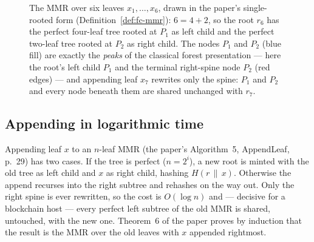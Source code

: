\documentclass[11pt,a4paper]{article}
\theoremstyle{definition}
\begin{document}
\begin{figure}[htbp]
\centering
{}
\caption{The MMR over six leaves $x_1, \dots, x_6$, drawn in the paper's
single-rooted form (Definition~\ref{def:fc-mmr}): $6 = 4 + 2$, so the root
$r_6$ has the perfect four-leaf tree rooted at $P_1$ as left child and the
perfect two-leaf tree rooted at $P_2$ as right child. The nodes $P_1$ and
$P_2$ (blue fill) are exactly the \emph{peaks} of the classical forest
presentation --- here the root's left child $P_1$ and the terminal
right-spine node $P_2$ (red edges) --- and appending leaf $x_7$ rewrites
only the spine: $P_1$ and $P_2$ and every
node beneath them are shared unchanged with $r_7$.}
\label{fig:fc-mmr}
\end{figure}

\subsection{Appending in logarithmic time}\label{sec:fc-mmr-append}

Appending leaf $x$ to an $n$-leaf MMR (the paper's Algorithm~5,
\textsf{AppendLeaf}, p.~29) has two cases. If the tree is perfect
($n = 2^i$), a new root is minted with the old tree as left child and $x$
as right child, hashing $H(r \,\|\, x)$. Otherwise the append recurses into
the right subtree and rehashes on the way out. Only the right spine is ever
rewritten, so the cost is $O(\log n)$ and --- decisive for a blockchain
host --- every perfect left subtree of the old MMR is shared, untouched,
with the new one. Theorem~6 of the paper proves by induction that the
result is the MMR over the old leaves with $x$ appended rightmost.
\end{document}
